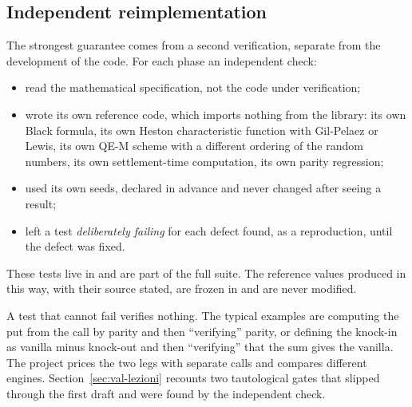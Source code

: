 \subsection{Independent reimplementation}
The strongest guarantee comes from a second verification, separate from the development of the code. For each phase an
independent check:
\begin{itemize}
\item read the mathematical specification, not the code under verification;
\item wrote its own reference code, which imports nothing from the library: its own Black formula, its own Heston
characteristic function with Gil-Pelaez or Lewis, its own \mbox{QE-M} scheme with a different ordering of the random
numbers, its own settlement-time computation, its own parity regression;
\item used its own seeds, declared in advance and never changed after seeing a result;
\item left a test \emph{deliberately failing} for each defect found, as a reproduction, until the defect was fixed.
\end{itemize}
These tests live in  and are part of the full suite. The reference values produced in this
way, with their source stated, are frozen in  and are never modified.

\begin{attenzione}[title={The tautological test}]
A test that cannot fail verifies nothing. The typical examples are computing the put from the call by parity and then
``verifying'' parity, or defining the knock-in as vanilla minus knock-out and then ``verifying'' that the sum gives the
vanilla. The project prices the two legs with separate calls and compares different engines. Section~\ref{sec:val-lezioni} recounts two tautological gates that slipped through the first draft and were found by the
independent check.
\end{attenzione}

